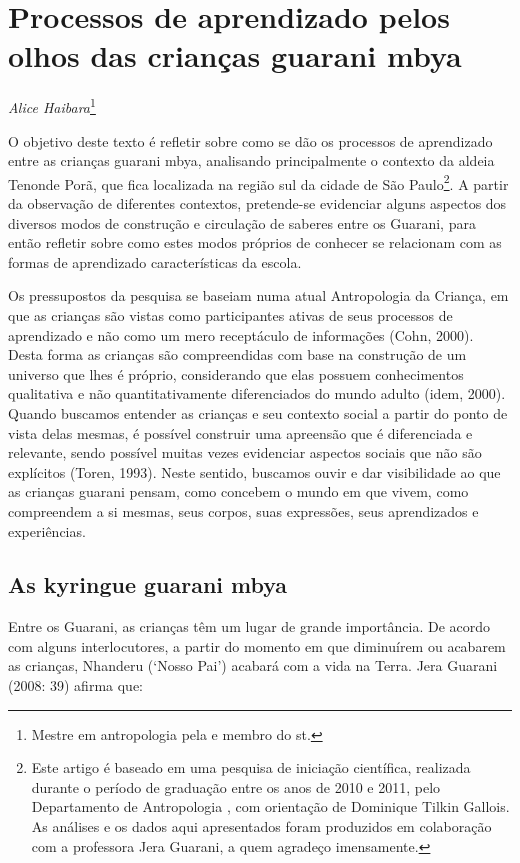 \chapter{Processos de aprendizado pelos olhos das crianças guarani mbya}
\begin{flushright}
\emph{Alice Haibara}\footnote{Mestre em antropologia pela  e membro do
st.}
\end{flushright}

O objetivo deste texto é refletir sobre como se dão os processos de
aprendizado entre as crianças guarani mbya, analisando principalmente o
contexto da aldeia Tenonde Porã, que fica localizada na região sul da
cidade de São Paulo\footnote{Este artigo é baseado em uma pesquisa de
iniciação científica, realizada durante o período de graduação entre os
anos de 2010 e 2011, pelo Departamento de Antropologia , com
orientação de Dominique Tilkin Gallois. As análises e os dados aqui
apresentados foram produzidos em colaboração com a professora Jera
Guarani, a quem agradeço imensamente.}. A partir da observação de
diferentes contextos, pretende-se evidenciar alguns aspectos dos
diversos modos de construção e circulação de saberes entre os Guarani,
para então refletir sobre como estes modos próprios de conhecer se
relacionam com as formas de aprendizado características da escola.

Os pressupostos da pesquisa se baseiam numa atual Antropologia da
Criança, em que as crianças são vistas como participantes ativas de
seus processos de aprendizado e não como um mero receptáculo de
informações (Cohn, 2000). Desta forma as crianças são compreendidas com
base na construção de um universo que lhes é próprio, considerando que
elas possuem conhecimentos qualitativa e não quantitativamente
diferenciados do mundo adulto (idem, 2000). Quando buscamos entender as
crianças e seu contexto social a partir do ponto de vista delas mesmas,
é possível construir uma apreensão que é diferenciada e relevante,
sendo possível muitas vezes evidenciar aspectos sociais que não são
explícitos (Toren, 1993). Neste sentido, buscamos ouvir e dar
visibilidade ao que as crianças guarani pensam, como concebem o mundo
em que vivem, como compreendem a si mesmas, seus corpos, suas
expressões, seus aprendizados e experiências. 

\section{As kyringue guarani mbya}
Entre os Guarani, as crianças têm um lugar de grande importância. De
acordo com alguns interlocutores, a partir do momento em que diminuírem
ou acabarem as crianças, Nhanderu (‘Nosso Pai’) acabará com a vida na
Terra. Jera Guarani (2008: 39) afirma que:

